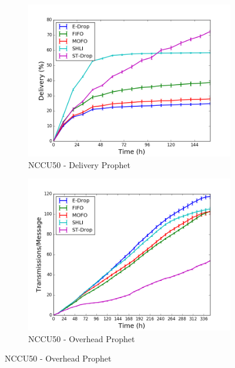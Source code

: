 \begin{figure}
    \begin{subfigure}[b]{0.5\columnwidth}
        \includegraphics[width=\linewidth]{imgs/nccu/50/Prophet-delivery.png}
        \caption{NCCU50 - Delivery Prophet}
        \label{fig:nccu50ProphetDel}
    \end{subfigure}
    \begin{subfigure}[b]{0.5\columnwidth}
        \includegraphics[width=\linewidth]{imgs/nccu/50/Prophet-overhead.png}
        \caption{NCCU50 - Overhead Prophet}
        \label{fig:nccu50ProphetOver}
    \end{subfigure}


\end{figure}
